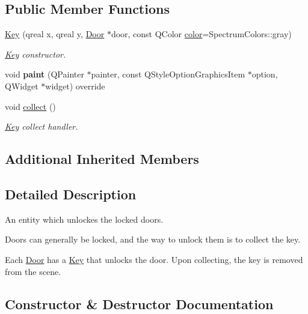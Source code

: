\subsection*{Public Member Functions}
\begin{DoxyCompactItemize}
\item 
\hyperlink{class_key_ab654663763723accb646253e95b6f215}{Key} (qreal x, qreal y, \hyperlink{class_door}{Door} $\ast$door, const Q\+Color \hyperlink{class_entity_ad14bf88ca550e2e5b13438a3faf545e6}{color}=Spectrum\+Colors\+::gray)
\begin{DoxyCompactList}\small\item\em \hyperlink{class_key}{Key} constructor. \end{DoxyCompactList}\item 
\mbox{\label{class_key_ae5ac4fed69ea016d1a7aa233f9219d37}} 
void {\bfseries paint} (Q\+Painter $\ast$painter, const Q\+Style\+Option\+Graphics\+Item $\ast$option, Q\+Widget $\ast$widget) override
\item 
\mbox{\label{class_key_acd4998bc640430d0b36ec1e7adca0fef}} 
void \hyperlink{class_key_acd4998bc640430d0b36ec1e7adca0fef}{collect} ()
\begin{DoxyCompactList}\small\item\em \hyperlink{class_key}{Key} collect handler. \end{DoxyCompactList}\end{DoxyCompactItemize}
\subsection*{Additional Inherited Members}


\subsection{Detailed Description}
An entity which unlockes the locked doors. 

Doors can generally be locked, and the way to unlock them is to collect the key.

Each \hyperlink{class_door}{Door} has a \hyperlink{class_key}{Key} that unlocks the door. Upon collecting, the key is removed from the scene. 

\subsection{Constructor \& Destructor Documentation}
\mbox{\label{class_key_ab654663763723accb646253e95b6f215}} 
